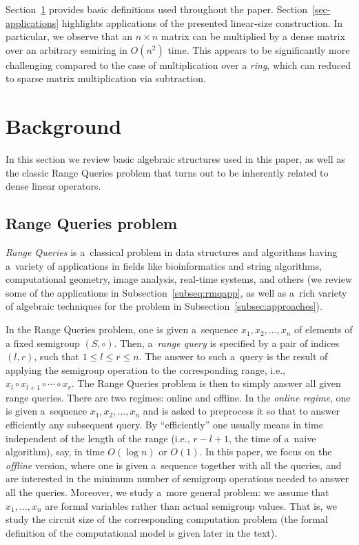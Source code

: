 \documentclass[11pt,letterpaper]{article}
\begin{document}
Section~\ref{sec-background} provides basic definitions used throughout the
paper. Section~\ref{sec-applications} highlights applications of the
presented linear-size construction. In particular, we observe that an
$n\times n$ matrix can be multiplied by a dense matrix over an arbitrary
semiring in $O(n^2)$ time. This appears to be significantly more challenging
compared to the case of multiplication over a \emph{ring}, which can reduced to
sparse matrix multiplication via subtraction.

\section{Background}\label{sec-background}

In this section we review basic algebraic structures used in this paper, as well
as the classic Range Queries problem that turns out to be inherently related to
dense linear operators.



\subsection{Range Queries problem}
{\em Range Queries} is a~classical problem in data structures and algorithms
having a~variety of applications in fields like bioinformatics and string
algorithms, computational geometry, image analysis, real-time systems, and
others (we review some of the applications in Subsection~\ref{subseq:rmqapp}, as
well as a~rich variety of algebraic techniques for the problem in
Subsection~\ref{subsec:approaches}).

In the Range Queries problem, one is given a~sequence $x_1, x_2, \dotsc, x_n$ of
elements of a fixed semigroup $(S, \circ)$. Then, a~\emph{range query} is
specified by a pair of indices $(l,r)$, such that $1 \le l \le r \le n$. The
answer to such a~query is the result of applying the semigroup operation to the
corresponding range, i.e., $x_l \circ x_{l+1} \circ \dotsb \circ x_r$. The Range
Queries problem is then to simply answer all given range queries. There are two
regimes: online and offline. In the {\em online regime}, one is given
a~sequence $x_1, x_2, \dotsc, x_n$ and is asked to preprocess it so that to
answer efficiently any subsequent query. By ``efficiently'' one usually
means in time independent of the length of the range (i.e., $r-l+1$, the time
of a~naive algorithm), say, in time $O(\log n)$ or $O(1)$. In this paper, we
focus on the {\em offline} version, where one is given a~sequence together with
all the queries, and are interested in the minimum number of semigroup
operations needed to answer all the queries. Moreover, we study a~more general
problem: we assume that $x_1, \dotsc, x_n$ are formal variables rather than
actual semigroup values. That is, we study the circuit size of the corresponding
computation problem (the formal definition of the computational model is given
later in the text).
\end{document}
